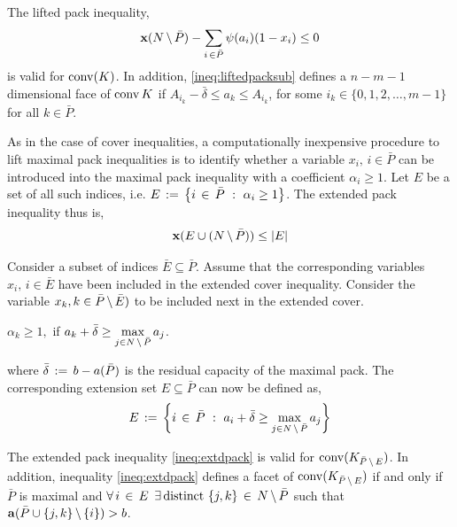 \documentclass[10pt,twoside]{amsart}
\begin{document}
\begin{prop}
  The lifted pack inequality,
    \begin{align}
        \mathbf{x}(N\,\backslash\, \bar{P}) - \sum_{i\,\in \bar{P}} \psi(a_i) (1-x_i) \leq 0 \label{ineq:liftedpacksub}
    \end{align}
    is valid for $\operatorname{conv}(K)$. In addition, \eqref{ineq:liftedpacksub} defines a $n-m-1$ dimensional face of $\operatorname{conv}{K}$ if $A_{i_k} - \bar{\delta} \leq a_{k} \leq A_{i_k}$, for some $i_k \in \{0,1,2,\ldots, m-1\}$ for all $k \in \bar{P}$.
\end{prop}

As in the case of cover inequalities, a computationally inexpensive procedure to lift maximal pack inequalities is to identify whether a variable $x_i,\,i\in \bar{P}$ can be introduced into the maximal pack inequality with a coefficient $\alpha_i \geq 1$. Let $E$ be a set of all such indices, i.e. $E \,:=\, \left\{ {i\,\in\, \bar{P}} \ : \ {\alpha_i \geq 1} \right\}$. The extended pack inequality thus is,
\begin{align}
    \mathbf{x}(E \cup (N\,\backslash\, \bar{P})) \leq |E| \label{ineq:extdpack}
\end{align}

Consider a subset of indices $\bar{E} \subseteq \bar{P}$. Assume that the corresponding variables $x_i,\,i\in \bar{E}$ have been included in the extended cover inequality. Consider the variable $x_k, k \in \bar{P}\,\backslash\, \bar{E})$ to be included next in the extended cover.

\begin{prop}
  $\alpha_k \geq 1,$ if $a_k + \bar{\delta} \geq \underset{j\in N\,\backslash\, \bar{P}}{\max}\, a_j$.
\end{prop}
where $\bar{\delta}\,:=\, b - a(\bar{P})$ is the residual capacity of the maximal pack. The corresponding extension set $E \subseteq \bar{P}$ can now be defined as,
\begin{align}
\label{set:packext}
        E \,:=\, \left\{ {i\,\in\, \bar{P}} \ : \ {a_i + \bar{\delta} \geq \underset{j\in N\,\backslash\, \bar{P}}{\max}\, a_j} \right\}
\end{align}

\begin{prop}
  The extended pack inequality \eqref{ineq:extdpack} is valid for $\operatorname{conv}(K_{\bar{P}\,\backslash\, E})$. In addition, inequality \eqref{ineq:extdpack} defines a facet of $\operatorname{conv}(K_{\bar{P}\,\backslash\, E})$ if and only if $\bar{P}$ is maximal and $\forall\, i\,\in\, E$ $\exists\, \text{distinct }\{j,k\}\,\in\, N\,\backslash\, \bar{P}$ such that $\mathbf{a}(\bar{P}\cup \{j,k\}\,\backslash\, \{i\}) > b$.
\end{prop}
\end{document}
